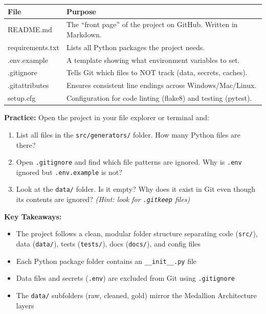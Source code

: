 \documentclass[12pt, a4paper, oneside]{report}
\begin{document}
\begin{longtable}{>{\ttfamily\small}p{4.5cm} p{9cm}}
    \toprule
    \normalfont\textbf{File} & \textbf{Purpose} \\
    \midrule
    \endhead
    README.md & The ``front page'' of the project on GitHub. Written in Markdown. \\
    requirements.txt & Lists all Python packages the project needs. \\
    .env.example & A template showing what environment variables to set. \\
    .gitignore & Tells Git which files to NOT track (data, secrets, caches). \\
    .gitattributes & Ensures consistent line endings across Windows/Mac/Linux. \\
    setup.cfg & Configuration for code linting (flake8) and testing (pytest). \\
    \bottomrule
\end{longtable}

\begin{exercisebox}
\textbf{Practice:} Open the project in your file explorer or terminal and:
\begin{enumerate}
    \item List all files in the \texttt{src/generators/} folder. How many Python files are there?
    \item Open \texttt{.gitignore} and find which file patterns are ignored. Why is \texttt{.env} ignored but \texttt{.env.example} is not?
    \item Look at the \texttt{data/} folder. Is it empty? Why does it exist in Git even though its contents are ignored? \textit{(Hint: look for \texttt{.gitkeep} files)}
\end{enumerate}
\end{exercisebox}

\begin{summarybox}
\textbf{Key Takeaways:}
\begin{itemize}
    \item The project follows a clean, modular folder structure separating code (\texttt{src/}), data (\texttt{data/}), tests (\texttt{tests/}), docs (\texttt{docs/}), and config files
    \item Each Python package folder contains an \texttt{\_\_init\_\_.py} file
    \item Data files and secrets (\texttt{.env}) are excluded from Git using \texttt{.gitignore}
    \item The \texttt{data/} subfolders (raw, cleaned, gold) mirror the Medallion Architecture layers
\end{itemize}
\end{summarybox}
\end{document}
